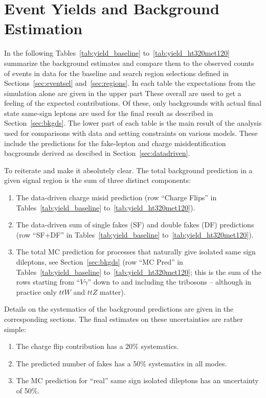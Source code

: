\section{Event Yields and Background Estimation}
\label{sec:yields}

In the following Tables~\ref{tab:yield_baseline} to~\ref{tab:yield_ht320met120} summarize the background 
estimates and compare them to the
observed counts of events in data for the baseline and search region selections
defined in Sections~\ref{sec:eventsel} and~\ref{sec:regions}.
In each table the expectations from the simulation alone are given in the upper part
 These overall are used to get a feeling of the expected contributions.
Of these, only backgrounds with actual final state same-sign leptons are used for the final result
as described in Section~\ref{sec:bkgds}.
The lower part of each table is the main result of the analysis
used for comparisons with data and setting constraints on various models.
These include the predictions for the fake-lepton and charge misidentification
bacgrounds derived as descibed in Section~\ref{sec:datadriven}.

To reiterate and make it absolutely clear.  The total background
prediction in a given signal region
is the sum of three distinct components:
\begin{enumerate}

\item The data-driven charge misid prediction (row ``Charge Flips'' in
Tables~\ref{tab:yield_baseline} to~\ref{tab:yield_ht320met120}).

\item The data-driven sum of single fakes (SF) and double fakes
(DF) predictions (row ``SF$+$DF''
in Tables~\ref{tab:yield_baseline} to~\ref{tab:yield_ht320met120}).

\item The total MC prediction for processes that naturally give isolated
same sign dileptons, see Section~\ref{sec:bkgds} (row ``MC Pred'' in
Tables~\ref{tab:yield_baseline} to~\ref{tab:yield_ht320met120};
this is the sum of the rows starting from ``$V\gamma$'' down to 
and including the tribosons -- although in practice only $ttW$ and 
$ttZ$ matter).

\end{enumerate}

Details on the systematics of the background predictions are given in the corresponding sections.
The final estimates on these uncertainties are rather simple:
\begin{enumerate}
\item The charge flip contribution has a 20\% systematics.
  \item The predicted number of fakes has a 50\% systematics in all modes.
  \item The MC prediction for ``real'' same sign isolated dileptons
    has an uncertainty of 50\%.
  
\end{enumerate}

